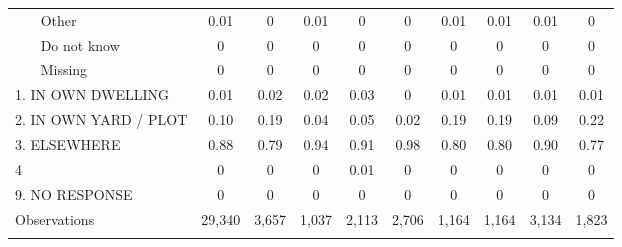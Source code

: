 \begin{table}[htbp]
\begin{tabular}{l*{9}{c}}
~~~ Other        &        0.01&        0&        0.01&        0&        0&        0.01&        0.01&        0.01&        0\\
~~~ Do not know  &        0&        0&        0&        0&        0&        0&        0&        0&        0\\
~~~ Missing      &        0&        0&        0&        0&        0&        0&        0&        0&        0\\
1. IN OWN DWELLING  &        0.01&        0.02&        0.02&        0.03&        0&        0.01&        0.01&        0.01&        0.01\\
2. IN OWN YARD / PLOT&        0.10&        0.19&        0.04&        0.05&        0.02&        0.19&        0.19&        0.09&        0.22\\
3. ELSEWHERE        &        0.88&        0.79&        0.94&        0.91&        0.98&        0.80&        0.80&        0.90&        0.77\\
4                   &        0&        0&        0&        0.01&        0&        0&        0&        0&        0\\
9. NO RESPONSE      &        0&        0&        0&        0&        0&        0&        0&        0&        0\\
\hline
Observations        &      29,340&       3,657&       1,037&       2,113&       2,706&       1,164&       1,164&       3,134&       1,823\\
\hline\hline
\multicolumn{10}{p{0.87\linewidth}}{\footnotesize }\\
\end{tabular}
\end{table}
